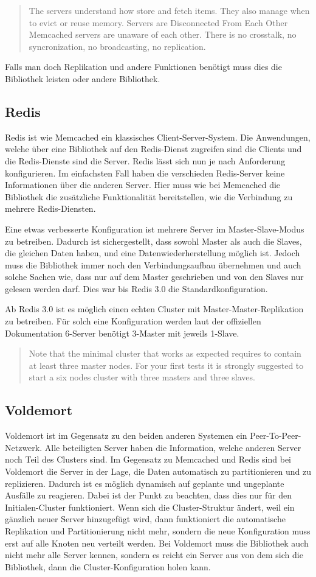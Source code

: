 \foreignblockquote{english}[\cite{Memcached2015}]{The servers understand how
store and fetch items. They also manage when to evict or reuse memory. Servers
are Disconnected From Each Other Memcached servers are unaware of each other.
There is no crosstalk, no syncronization, no broadcasting, no replication.}

Falls man doch Replikation und andere Funktionen benötigt muss dies die
Bibliothek leisten oder andere Bibliothek.

\subsection{Redis}
Redis ist wie Memcached ein klassisches Client-Server-System. Die Anwendungen,
welche über eine Bibliothek auf den Redis-Dienst zugreifen sind die Clients und
die Redis-Dienste sind die Server. Redis lässt sich nun je nach Anforderung
konfigurieren. Im einfachsten Fall haben die verschieden Redis-Server keine
Informationen über die anderen Server. Hier muss wie bei Memcached die
Bibliothek die zusätzliche Funktionalität bereitstellen, wie die Verbindung zu
mehrere Redis-Diensten.

Eine etwas verbesserte Konfiguration ist mehrere Server im Master-Slave-Modus
zu betreiben. Dadurch ist sichergestellt, dass sowohl Master als auch die
Slaves, die gleichen Daten haben, und eine Datenwiederherstellung möglich ist.
Jedoch muss die Bibliothek immer noch den Verbindungsaufbau übernehmen und auch
solche Sachen wie, dass nur auf dem Master geschrieben und von den Slaves nur
gelesen werden darf. Dies war bis Redis 3.0 die Standardkonfiguration.

Ab Redis 3.0 ist es möglich einen echten Cluster mit Master-Master-Replikation
zu betreiben. Für solch eine Konfiguration werden laut der offiziellen
Dokumentation 6-Server benötigt 3-Master mit jeweils 1-Slave.

\foreignblockquote{english}[\cite{Redis2010}]{Note that the minimal cluster
that works as expected requires to contain at least three master nodes. For your
first tests it is strongly suggested to start a six nodes cluster with three
masters and three slaves.}

\subsection{Voldemort}
Voldemort ist im Gegensatz zu den beiden anderen Systemen ein
Peer-To-Peer-Netzwerk. Alle beteiligten Server haben die Information, welche
anderen Server noch Teil des Clusters sind. Im Gegensatz zu Memcached und Redis
sind bei Voldemort die Server in der Lage, die Daten automatisch zu
partitionieren und zu replizieren. Dadurch ist es möglich dynamisch auf geplante
und ungeplante Ausfälle zu reagieren. Dabei ist der Punkt zu beachten, dass
dies nur für den Initialen-Cluster funktioniert. Wenn sich die Cluster-Struktur
ändert, weil ein gänzlich neuer Server hinzugefügt wird, dann funktioniert die
automatische Replikation und Partitionierung nicht mehr, sondern die neue
Konfiguration muss erst auf alle Knoten neu verteilt werden. Bei Voldemort muss
die Bibliothek auch nicht mehr alle Server kennen, sondern es reicht ein Server
aus von dem sich die Bibliothek, dann die Cluster-Konfiguration holen kann.
